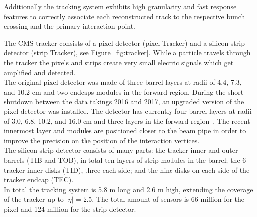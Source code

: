 Additionally the tracking system exhibits high granularity and
fast response features to correctly associate each reconstructed track
to the respective bunch crossing and the primary interaction point.

The CMS tracker consists of a pixel detector (pixel Tracker) and a
silicon strip detector (strip Tracker), see
Figure~\ref{fig:tracker}. While a particle travels through the tracker the pixels and
strips create very small electric signals which get amplified and
detected.\\
The original pixel detector was made of three barrel
layers at radii of 4.4, 7.3, and 10.2 cm and two endcaps modules in
the forward region. 
During the short shutdown between the data takings 2016 and 2017, 
an
upgraded version of the pixel detector was installed. The detector has currently four
barrel layers at radii of 3.0, 6.8, 10.2, and
16.0 cm and three layers in the forward region~\cite{Dominguez:1481838}. The
recent innermost layer and modules
are positioned closer to the beam pipe in order to improve the
precision on the position of the interaction vertices.\\
The silicon strip detector consists of many parts: the tracker inner and
outer barrels (TIB and TOB), in total ten layers of strip modules in
the barrel; the 6 tracker inner disks (TID), three each
side; and the nine disks on each side of the tracker endcap (TEC).\\
In total the tracking system is 5.8 m long and 2.6 m high,
extending the coverage of the tracker up to $|\eta|$ = 2.5. The total
amount of sensors is 66 million for the pixel and 124 million for the
strip detector. 

